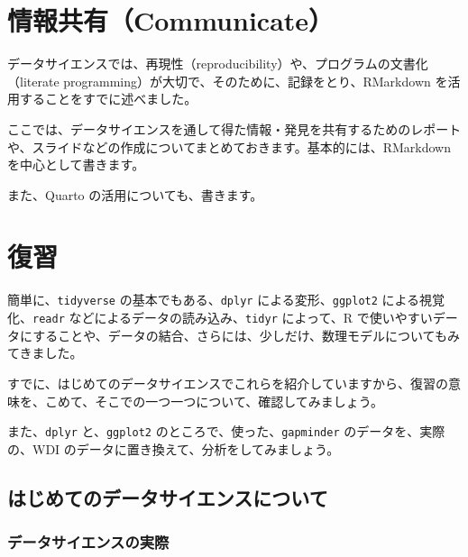 \documentclass[
  xelatex, ja=standard]{bxjsbook}
\theoremstyle{definition}
\theoremstyle{definition}
\theoremstyle{definition}
\theoremstyle{definition}
\theoremstyle{remark}
\begin{document}
\hypertarget{communicate}{%
\chapter{情報共有（Communicate）}\label{communicate}}

データサイエンスでは、再現性（reproducibility）や、プログラムの文書化（literate programming）が大切で、そのために、記録をとり、RMarkdown を活用することをすでに述べました。

ここでは、データサイエンスを通して得た情報・発見を共有するためのレポートや、スライドなどの作成についてまとめておきます。基本的には、RMarkdown を中心として書きます。

また、Quarto の活用についても、書きます。

\hypertarget{aboutfirstexample}{%
\chapter{復習}\label{aboutfirstexample}}

簡単に、\texttt{tidyverse} の基本でもある、\texttt{dplyr} による変形、\texttt{ggplot2} による視覚化、\texttt{readr} などによるデータの読み込み、\texttt{tidyr} によって、R で使いやすいデータにすることや、データの結合、さらには、少しだけ、数理モデルについてもみてきました。

すでに、はじめてのデータサイエンスでこれらを紹介していますから、復習の意味を、こめて、そこでの一つ一つについて、確認してみましょう。

また、\texttt{dplyr} と、\texttt{ggplot2} のところで、使った、\texttt{gapminder} のデータを、実際の、WDI のデータに置き換えて、分析をしてみましょう。

\hypertarget{ux306fux3058ux3081ux3066ux306eux30c7ux30fcux30bfux30b5ux30a4ux30a8ux30f3ux30b9ux306bux3064ux3044ux3066}{%
\section{はじめてのデータサイエンスについて}\label{ux306fux3058ux3081ux3066ux306eux30c7ux30fcux30bfux30b5ux30a4ux30a8ux30f3ux30b9ux306bux3064ux3044ux3066}}

\hypertarget{ux30c7ux30fcux30bfux30b5ux30a4ux30a8ux30f3ux30b9ux306eux5b9fux969b-1}{%
\subsection{データサイエンスの実際}\label{ux30c7ux30fcux30bfux30b5ux30a4ux30a8ux30f3ux30b9ux306eux5b9fux969b-1}}
\end{document}
